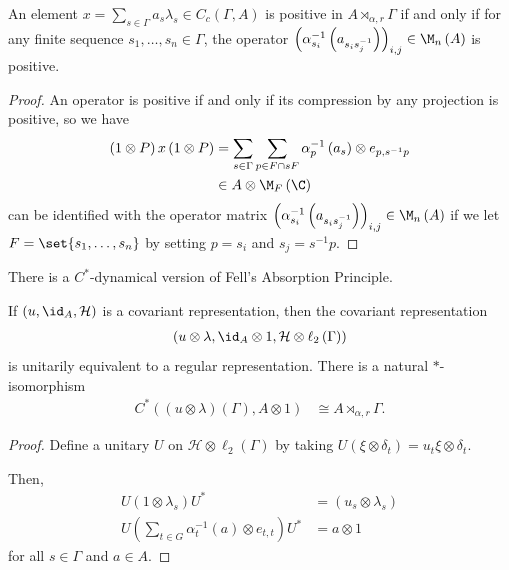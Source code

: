 \documentclass[10pt]{mypackage}
\begin{document}
\begin{corollary}
  An element $x=\sum_{s\in\Gamma}a_s\lambda_s\in C_c\left( \Gamma,A \right)$ is positive in $A\rtimes_{\alpha,r}\Gamma$ if and only if for any finite sequence $s_1,\dots,s_n\in \Gamma$, the operator $\left( \alpha_{s_i}^{-1}\left( a_{s_is_j^{-1}} \right) \right)_{i,j}\in \M_n\left( A \right)$ is positive.
\end{corollary}
\begin{proof}
  An operator is positive if and only if its compression by any projection is positive, so we have
  \begin{align*}
    \left( 1\otimes P \right)x\left( 1\otimes P \right) &= \sum_{s\in \Gamma} \sum_{p\in F\cap sF} \alpha_p^{-1}\left( a_s \right)\otimes e_{p,s^{-1}p}\\
                                                        &\in A\otimes \M_F\left( \C \right)
  \end{align*}
  can be identified with the operator matrix $\left( \alpha_{s_i}^{-1}\left( a_{s_is_j^{-1}} \right) \right)_{i,j}\in \M_n\left( A \right)$ if we let $F = \set{s_1,\dots,s_n}$ by setting $p = s_i$ and $s_j = s^{-1}p$.
\end{proof}
There is a $C^{\ast}$-dynamical version of Fell's Absorption Principle.
\begin{proposition}
  If $\left( u,\id_A,\mathcal{H} \right)$ is a covariant representation, then the covariant representation
  \begin{align*}
    \left( u\otimes\lambda,\id_A\otimes 1,\mathcal{H}\otimes \ell_2\left( \Gamma \right) \right)
  \end{align*}
  is unitarily equivalent to a regular representation. There is a natural $\ast$-isomorphism
  \begin{align*}
    C^{\ast}\left( \left( u\otimes\lambda \right)\left( \Gamma \right),A\otimes 1 \right) &\cong A\rtimes_{\alpha,r}\Gamma.
  \end{align*}
\end{proposition}
\begin{proof}
  Define a unitary $U$ on $ \mathcal{H}\otimes \ell_2\left( \Gamma \right) $ by taking $U\left( \xi\otimes \delta_t \right) = u_t\xi\otimes \delta_t$. 

  Then,
  \begin{align*}
    U\left( 1\otimes \lambda_s \right)U^{\ast} &= \left( u_s\otimes\lambda_s \right)\\
    U\left( \sum_{t\in G}\alpha_t^{-1}(a)\otimes e_{t,t} \right)U^{\ast} &= a\otimes 1
  \end{align*}
  for all $s\in \Gamma$ and $a\in A$.
\end{proof}
\end{document}
